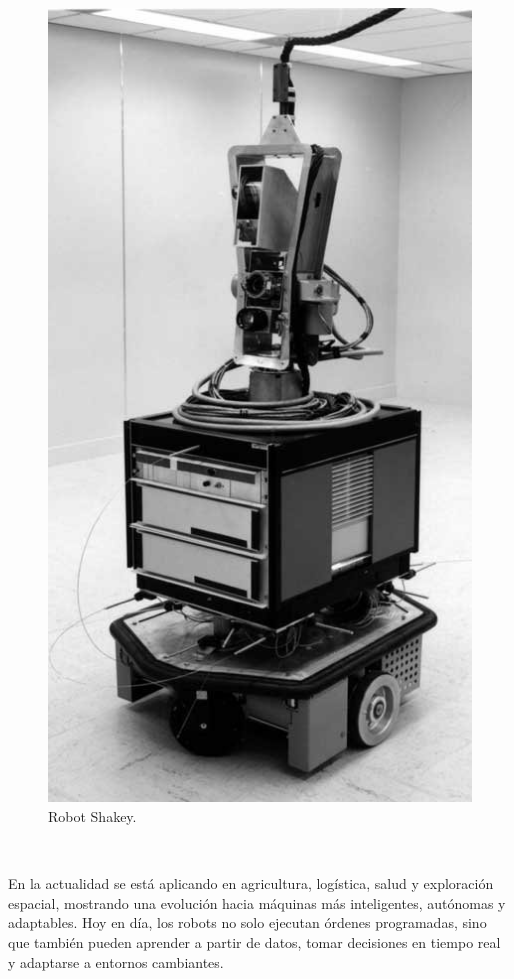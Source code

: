 \begin{figure} [H]
  \begin{center}
    \includegraphics[scale=0.3]{figs/shakey}
  \end{center}
  \caption{Robot Shakey.}
  \label{fig:shakey}
\end{figure}\

En la actualidad se está aplicando en agricultura, logística, salud y exploración espacial, mostrando una evolución hacia máquinas más inteligentes, autónomas y adaptables. Hoy en día, los robots no solo ejecutan órdenes programadas, sino que también pueden aprender a partir de datos, tomar decisiones en tiempo real y adaptarse a entornos cambiantes. \\





